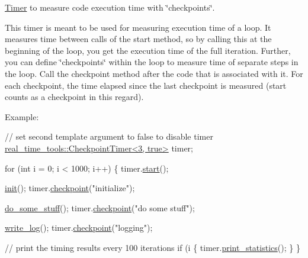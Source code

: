\hyperlink{classreal__time__tools_1_1Timer}{Timer} to measure code execution time with \char`\"{}checkpoints\char`\"{}. 

This timer is meant to be used for measuring execution time of a loop. It measures time between calls of the {\ttfamily start} method, so by calling this at the beginning of the loop, you get the execution time of the full iteration. Further, you can define \char`\"{}checkpoints\char`\"{} within the loop to measure time of separate steps in the loop. Call the {\ttfamily checkpoint} method after the code that is associated with it. For each checkpoint, the time elapsed since the last checkpoint is measured ({\ttfamily start} counts as a checkpoint in this regard).

Example\+: 
\begin{DoxyCodeInclude}

    \textcolor{comment}{// set second template argument to false to disable timer}
    \hyperlink{classreal__time__tools_1_1CheckpointTimer}{real\_time\_tools::CheckpointTimer<3, true>} timer;

    \textcolor{keywordflow}{for} (\textcolor{keywordtype}{int} i = 0; i < 1000; i++)
    \{
        timer.\hyperlink{classreal__time__tools_1_1CheckpointTimer_ad93a12cb74103528c8db4e7b1745eae6}{start}();

        \hyperlink{demo__checkpoint__timer_8cpp_a02fd73d861ef2e4aabb38c0c9ff82947}{init}();
        timer.\hyperlink{classreal__time__tools_1_1CheckpointTimer_a6e91b61b72c433a220b1bddb7a634bf5}{checkpoint}(\textcolor{stringliteral}{"initialize"});

        \hyperlink{demo__checkpoint__timer_8cpp_acb546a895e868f1a8fb9cb4b5a210f42}{do\_some\_stuff}();
        timer.\hyperlink{classreal__time__tools_1_1CheckpointTimer_a6e91b61b72c433a220b1bddb7a634bf5}{checkpoint}(\textcolor{stringliteral}{"do some stuff"});

        \hyperlink{demo__checkpoint__timer_8cpp_a609e6537df0c7eb15c1f5b4e02fbe0ed}{write\_log}();
        timer.\hyperlink{classreal__time__tools_1_1CheckpointTimer_a6e91b61b72c433a220b1bddb7a634bf5}{checkpoint}(\textcolor{stringliteral}{"logging"});

        \textcolor{comment}{// print the timing results every 100 iterations}
        \textcolor{keywordflow}{if} (i %
        \{
            timer.\hyperlink{classreal__time__tools_1_1CheckpointTimer_acce8c21123fe6f450c8f22de575cfef8}{print\_statistics}();
        \}
    \}

\end{DoxyCodeInclude}
 
